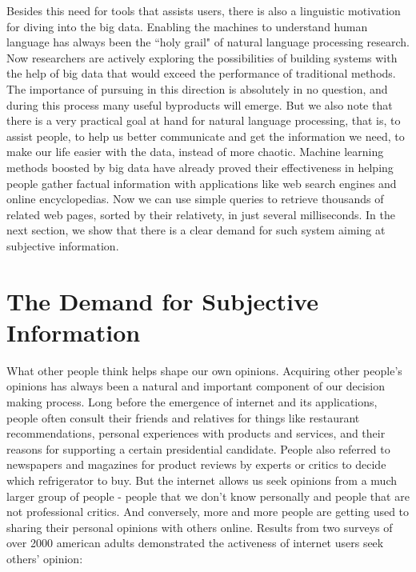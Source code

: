 Besides this need for tools that assists users, there is also a linguistic motivation for diving into the big data. Enabling the machines to understand human language has always been the ``holy grail" of natural language processing research. Now researchers are actively exploring the possibilities of building systems with the help of big data that would exceed the performance of traditional methods. The importance of pursuing in this direction is absolutely in no question, and during this process many useful byproducts will emerge. But we also note that there is a very practical goal at hand for natural language processing, that is, to assist people, to help us better communicate and get the information we need, to make our life easier with the data, instead of more chaotic. Machine learning methods boosted by big data have already proved their effectiveness in helping people gather factual information with applications like web search engines and online encyclopedias. Now we can use simple queries to retrieve thousands of related web pages, sorted by their relativety, in just several milliseconds. In the next section, we show that there is a clear demand for such system aiming at subjective information.


\section{The Demand for Subjective Information}

What other people think helps shape our own opinions. Acquiring other people's opinions has always been a natural and important component of our decision making process. Long before the emergence of internet and its applications, people often consult their friends and relatives for things like restaurant recommendations, personal experiences with products and services, and their reasons for supporting a certain presidential candidate. People also referred to newspapers and magazines for product reviews by experts or critics to decide which refrigerator to buy. But the internet allows us seek opinions from a much larger group of people - people that we don't know personally and people that are not professional critics. And conversely, more and more people are getting used to sharing their personal opinions with others online. Results from two surveys \cite{conrad2007opinion,horrigan2008online} of over 2000 american adults demonstrated the activeness of internet users seek others' opinion:

